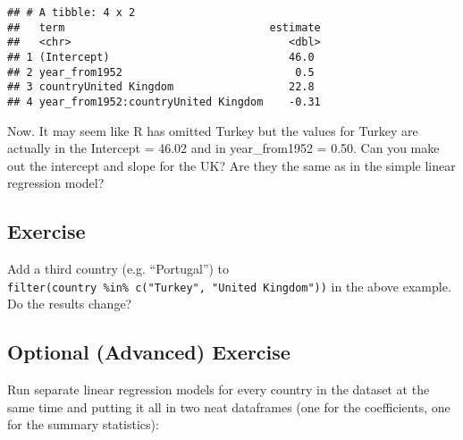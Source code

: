 \documentclass[]{book}
\makeatletter
\newenvironment{Shaded}{\begin{snugshade}}{\end{snugshade}}
\newcommand{\KeywordTok}[1]{\textcolor[rgb]{0.13,0.29,0.53}{\textbf{#1}}}
\newcommand{\DataTypeTok}[1]{\textcolor[rgb]{0.13,0.29,0.53}{#1}}
\newcommand{\DecValTok}[1]{\textcolor[rgb]{0.00,0.00,0.81}{#1}}
\newcommand{\StringTok}[1]{\textcolor[rgb]{0.31,0.60,0.02}{#1}}
\newcommand{\OperatorTok}[1]{\textcolor[rgb]{0.81,0.36,0.00}{\textbf{#1}}}
\newcommand{\NormalTok}[1]{#1}
\newenvironment{kframe}{%
\medskip{}
\setlength{\fboxsep}{.8em}
 \def\at@end@of@kframe{}%
 \ifinner\ifhmode%
  \def\at@end@of@kframe{\end{minipage}}%
  \begin{minipage}{\columnwidth}%
 \fi\fi%
 \def\FrameCommand##1{\hskip\@totalleftmargin \hskip-\fboxsep
 \colorbox{shadecolor}{##1}\hskip-\fboxsep
     \hskip-\linewidth \hskip-\@totalleftmargin \hskip\columnwidth}%
 \MakeFramed {\advance\hsize-\width
   \@totalleftmargin\z@ \linewidth\hsize
   \@setminipage}}%
 {\par\unskip\endMakeFramed%
 \at@end@of@kframe}
\renewenvironment{Shaded}{\begin{kframe}}{\end{kframe}}
\theoremstyle{definition}
\theoremstyle{definition}
\theoremstyle{definition}
\theoremstyle{remark}
\makeatother
\begin{document}
\begin{Shaded}
\end{Shaded}

\begin{verbatim}
## # A tibble: 4 x 2
##   term                                estimate
##   <chr>                                  <dbl>
## 1 (Intercept)                            46.0 
## 2 year_from1952                           0.5 
## 3 countryUnited Kingdom                  22.8 
## 4 year_from1952:countryUnited Kingdom    -0.31
\end{verbatim}

Now. It may seem like R has omitted Turkey but the values for Turkey are
actually in the Intercept = 46.02 and in year\_from1952 = 0.50. Can you
make out the intercept and slope for the UK? Are they the same as in the
simple linear regression model?

\subsection{Exercise}\label{exercise-40}

Add a third country (e.g. ``Portugal'') to
\texttt{filter(country\ \%in\%\ c("Turkey",\ "United\ Kingdom"))} in the
above example. Do the results change?

\subsection{Optional (Advanced)
Exercise}\label{optional-advanced-exercise-1}

Run separate linear regression models for every country in the dataset
at the same time and putting it all in two neat dataframes (one for the
coefficients, one for the summary statistics):
\end{document}
